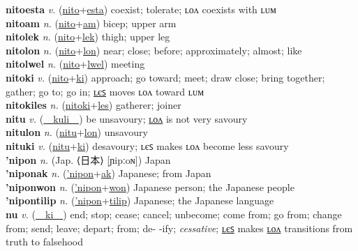 \textbf{nitoesta} \textit{v.} (\hyperref[nito]{nito}+\hyperref[esta]{esta})
coexist; tolerate; ʟᴏᴧ coexists with ʟᴜᴍ \label{nitoesta} \\
\textbf{nitoam} \textit{n.} (\hyperref[nito]{nito}+\hyperref[am]{am})
bicep; upper arm \label{nitoam} \\
\textbf{nitolek} \textit{n.} (\hyperref[nito]{nito}+\hyperref[lek]{lek})
thigh; upper leg \label{nitolek} \\
\textbf{nitolon} \textit{n.} (\hyperref[nito]{nito}+\hyperref[lon]{lon})
near; close; before; approximately; almost; like \label{nitolon} \\
\textbf{nitolwel} \textit{n.} (\hyperref[nito]{nito}+\hyperref[lwel]{lwel})
meeting \label{nitolwel} \\
\textbf{nitoki} \textit{v.} (\hyperref[nito]{nito}+\hyperref[ki]{ki})
approach; go toward; meet; draw close; bring together; gather; go to; go in; \hyperref[nitokiles]{ʟєꜱ} moves ʟᴏᴧ toward ʟᴜᴍ \label{nitoki} \\
\textbf{nitokiles} \textit{n.} (\hyperref[nitoki]{nitoki}+\hyperref[les]{les})
gatherer; joiner \label{nitokiles} \\
\textbf{nitu} \textit{v.} (\hyperref[kuli]{~~kuli~~})
be unsavoury; \hyperref[nitulon]{ʟᴏᴧ} is not very savoury \label{nitu} \\
\textbf{nitulon} \textit{n.} (\hyperref[nitu]{nitu}+\hyperref[lon]{lon})
unsavoury \label{nitulon} \\
\textbf{nituki} \textit{v.} (\hyperref[nitu]{nitu}+\hyperref[ki]{ki})
desavoury; ʟєꜱ makes ʟᴏᴧ become less savoury \label{nituki} \\
\textbf{'nipon} \textit{n.} (Jap. ⟨日本⟩ [ɲipːoɴ])
Japan \label{'nipon} \\
\textbf{'niponak} \textit{n.} (\hyperref['nipon]{'nipon}+\hyperref[ak]{ak})
Japanese; from Japan \label{'niponak} \\
\textbf{'niponwon} \textit{n.} (\hyperref['nipon]{'nipon}+\hyperref[won]{won})
Japanese person; the Japanese people \label{'niponwon} \\
\textbf{'nipontilip} \textit{n.} (\hyperref['nipon]{'nipon}+\hyperref[tilip]{tilip})
Japanese; the Japanese language \label{'nipontilip} \\
\textbf{nu} \textit{v.} (\hyperref[ki]{~~ki~~})
end; stop; cease; cancel; unbecome; come from; go from; change from; send; leave; depart; from; de- -ify; \textit{cessative}; \hyperref[nules]{ʟєꜱ} makes \hyperref[nulon]{ʟᴏᴧ} transitions from truth to falsehood \label{nu} \\
